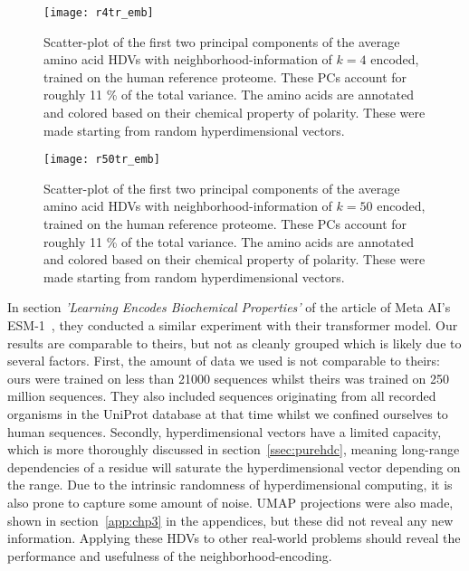 \begin{figure}[H]
    \centering
    \texttt{[image: r4tr\_emb]}
    \caption{Scatter-plot of the first two principal components of the average amino acid HDVs with neighborhood-information of $k = 4$ encoded, trained on the human reference proteome. These PCs account for roughly 11 \% of the total variance. The amino acids are annotated and colored based on their chemical property of polarity. These were made starting from random hyperdimensional vectors.}
    \label{fig:AArtr4}
\end{figure}

\begin{figure}[H]
    \centering
    \texttt{[image: r50tr\_emb]}
    \caption{Scatter-plot of the first two principal components of the average amino acid HDVs with neighborhood-information of $k = 50$ encoded, trained on the human reference proteome. These PCs account for roughly 11 \% of the total variance. The amino acids are annotated and colored based on their chemical property of polarity. These were made starting from random hyperdimensional vectors.}
    \label{fig:AArtr50}
\end{figure}

In section \textit{'Learning Encodes Biochemical Properties'} of the article of Meta AI's ESM-1~\cite{esm1}, they conducted a similar experiment with their transformer model. Our results are comparable to theirs, but not as cleanly grouped which is likely due to several factors. First, the amount of data we used is not comparable to theirs: ours were trained on less than 21000 sequences whilst theirs was trained on 250 million sequences. They also included sequences originating from all recorded organisms in the UniProt database at that time whilst we confined ourselves to human sequences. Secondly, hyperdimensional vectors have a limited capacity, which is more thoroughly discussed in section~\ref{ssec:purehdc}, meaning long-range dependencies of a residue will saturate the hyperdimensional vector depending on the range. Due to the intrinsic randomness of hyperdimensional computing, it is also prone to capture some amount of noise. UMAP projections were also made, shown in section~\ref{app:chp3} in the appendices, but these did not reveal any new information. Applying these HDVs to other real-world problems should reveal the performance and usefulness of the neighborhood-encoding.